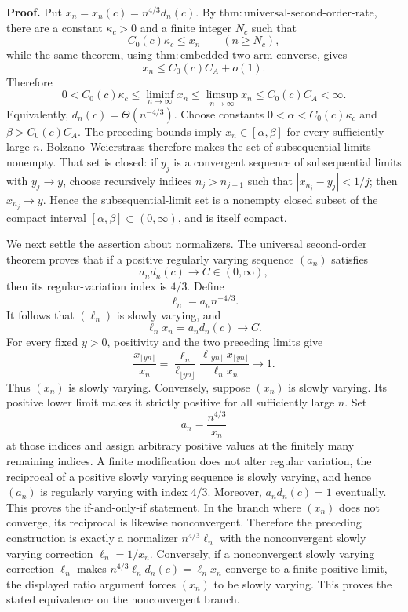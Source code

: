 \textbf{Proof.}
Put \(x_n=x_n(c)=n^{4/3}d_n(c)\).  By \(\mathrm{thm:universal\text{-}second\text{-}order\text{-}rate}\), there are a constant \(\kappa_c>0\) and a finite integer \(N_c\) such that
\[
 C_0(c)\kappa_c\leq x_n
 \qquad(n\geq N_c),
\]
while the same theorem, using \(\mathrm{thm:embedded\text{-}two\text{-}arm\text{-}converse}\), gives
\[
 x_n\leq C_0(c)C_A+o(1).
\]
Therefore
\[
 0<C_0(c)\kappa_c
 \leq\liminf_{n\to\infty}x_n
 \leq\limsup_{n\to\infty}x_n
 \leq C_0(c)C_A<\infty.
\]
Equivalently, \(d_n(c)=\Theta(n^{-4/3})\).  Choose constants \(0<\alpha< C_0(c)\kappa_c\) and \(\beta>C_0(c)C_A\).  The preceding bounds imply \(x_n\in[\alpha,\beta]\) for every sufficiently large \(n\).  Bolzano--Weierstrass therefore makes the set of subsequential limits nonempty.  That set is closed: if \(y_j\) is a convergent sequence of subsequential limits with \(y_j\to y\), choose recursively indices \(n_j>n_{j-1}\) such that \(|x_{n_j}-y_j|<1/j\); then \(x_{n_j}\to y\).  Hence the subsequential-limit set is a nonempty closed subset of the compact interval \([\alpha,\beta]\subset(0,\infty)\), and is itself compact.

We next settle the assertion about normalizers.  The universal second-order theorem proves that if a positive regularly varying sequence \((a_n)\) satisfies
\[
 a_nd_n(c)\longrightarrow C\in(0,\infty),
\]
then its regular-variation index is \(4/3\).  Define
\[
 \ell_n=a_nn^{-4/3}.
\]
It follows that \((\ell_n)\) is slowly varying, and
\[
 \ell_nx_n=a_nd_n(c)\longrightarrow C.
\]
For every fixed \(y>0\), positivity and the two preceding limits give
\[
 \frac{x_{\lfloor yn\rfloor}}{x_n}
 =\frac{\ell_n}{\ell_{\lfloor yn\rfloor}}
 \frac{\ell_{\lfloor yn\rfloor}x_{\lfloor yn\rfloor}}{\ell_nx_n}
 \longrightarrow1.
\]
Thus \((x_n)\) is slowly varying.  Conversely, suppose \((x_n)\) is slowly varying.  Its positive lower limit makes it strictly positive for all sufficiently large \(n\).  Set
\[
 a_n=\frac{n^{4/3}}{x_n}
\]
at those indices and assign arbitrary positive values at the finitely many remaining indices.  A finite modification does not alter regular variation, the reciprocal of a positive slowly varying sequence is slowly varying, and hence \((a_n)\) is regularly varying with index \(4/3\).  Moreover, \(a_nd_n(c)=1\) eventually.  This proves the if-and-only-if statement.  In the branch where \((x_n)\) does not converge, its reciprocal is likewise nonconvergent.  Therefore the preceding construction is exactly a normalizer \(n^{4/3}\ell_n\) with the nonconvergent slowly varying correction \(\ell_n=1/x_n\).  Conversely, if a nonconvergent slowly varying correction \(\ell_n\) makes \(n^{4/3}\ell_nd_n(c)=\ell_nx_n\) converge to a finite positive limit, the displayed ratio argument forces \((x_n)\) to be slowly varying.  This proves the stated equivalence on the nonconvergent branch.

